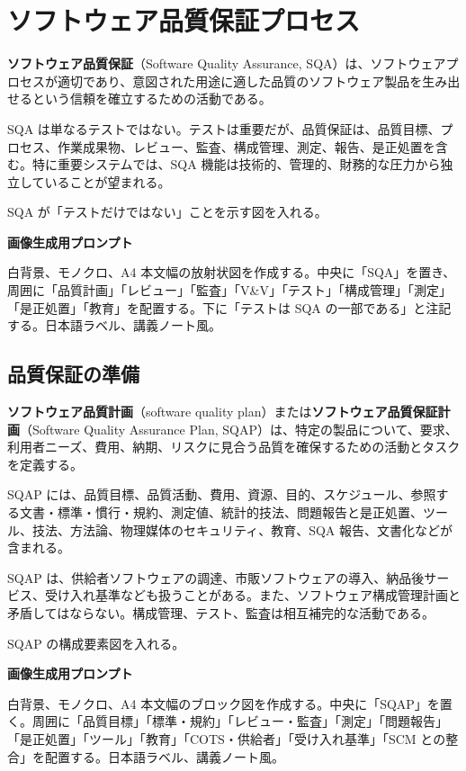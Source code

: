 \documentclass[11pt,a4paper]{article}
\newcommand{\term}[2]{\textbf{#1}（#2）}
\begin{document}
\section{ソフトウェア品質保証プロセス}
\term{ソフトウェア品質保証}{Software Quality Assurance, SQA}は、ソフトウェアプロセスが適切であり、意図された用途に適した品質のソフトウェア製品を生み出せるという信頼を確立するための活動である。

SQA は単なるテストではない。テストは重要だが、品質保証は、品質目標、プロセス、作業成果物、レビュー、監査、構成管理、測定、報告、是正処置を含む。特に重要システムでは、SQA 機能は技術的、管理的、財務的な圧力から独立していることが望まれる。

\begin{todobox}
SQA が「テストだけではない」ことを示す図を入れる。\par
\textbf{画像生成用プロンプト}\par
白背景、モノクロ、A4 本文幅の放射状図を作成する。中央に「SQA」を置き、周囲に「品質計画」「レビュー」「監査」「V\&V」「テスト」「構成管理」「測定」「是正処置」「教育」を配置する。下に「テストは SQA の一部である」と注記する。日本語ラベル、講義ノート風。
\end{todobox}

\subsection{品質保証の準備}
\term{ソフトウェア品質計画}{software quality plan}または\term{ソフトウェア品質保証計画}{Software Quality Assurance Plan, SQAP}は、特定の製品について、要求、利用者ニーズ、費用、納期、リスクに見合う品質を確保するための活動とタスクを定義する。

SQAP には、品質目標、品質活動、費用、資源、目的、スケジュール、参照する文書・標準・慣行・規約、測定値、統計的技法、問題報告と是正処置、ツール、技法、方法論、物理媒体のセキュリティ、教育、SQA 報告、文書化などが含まれる。

SQAP は、供給者ソフトウェアの調達、市販ソフトウェアの導入、納品後サービス、受け入れ基準なども扱うことがある。また、ソフトウェア構成管理計画と矛盾してはならない。構成管理、テスト、監査は相互補完的な活動である。

\begin{todobox}
SQAP の構成要素図を入れる。\par
\textbf{画像生成用プロンプト}\par
白背景、モノクロ、A4 本文幅のブロック図を作成する。中央に「SQAP」を置く。周囲に「品質目標」「標準・規約」「レビュー・監査」「測定」「問題報告」「是正処置」「ツール」「教育」「COTS・供給者」「受け入れ基準」「SCM との整合」を配置する。日本語ラベル、講義ノート風。
\end{todobox}
\end{document}
